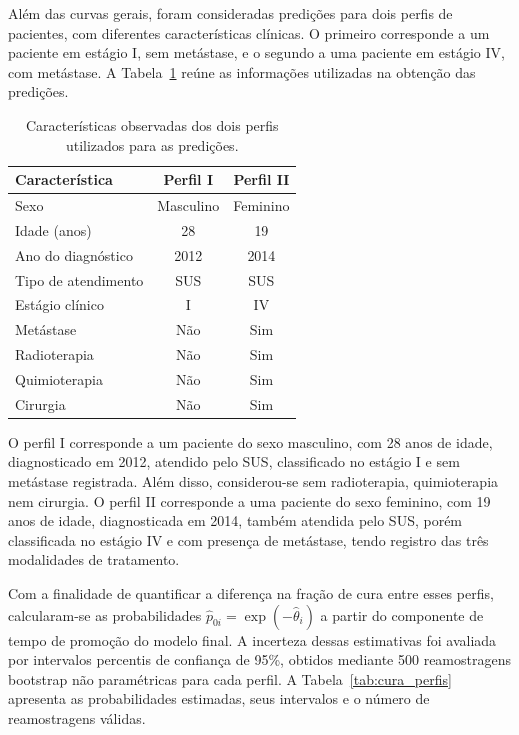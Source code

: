 \documentclass[11pt,a4paper]{article}
\begin{document}
Além das curvas gerais, foram consideradas predições para dois perfis de pacientes, com diferentes características clínicas. O primeiro corresponde a um paciente em estágio I, sem metástase, e o segundo a uma paciente em estágio IV, com metástase.  A Tabela~\ref{tab:caracteristicas_perfis} reúne as informações utilizadas na obtenção das predições.



\begin{table}[H]
\centering
\small
\setlength{\tabcolsep}{5pt}
\renewcommand{\arraystretch}{1.16}
\caption{Características observadas dos dois perfis utilizados para as predições.}
\label{tab:caracteristicas_perfis}
\begin{tabular}{@{}lcc@{}}
\toprule
Característica & Perfil I & Perfil II \\
\midrule
Sexo & Masculino & Feminino \\
Idade (anos) & 28 & 19 \\
Ano do diagnóstico & 2012 & 2014 \\
Tipo de atendimento & SUS & SUS \\
Estágio clínico & I & IV \\
Metástase & Não & Sim \\
Radioterapia & Não & Sim \\
Quimioterapia & Não & Sim \\
Cirurgia & Não & Sim \\
\bottomrule
\end{tabular}
\end{table}

O perfil I corresponde a um paciente do sexo masculino, com 28 anos de idade, diagnosticado em 2012, atendido pelo SUS, classificado no estágio I e sem metástase registrada. Além disso, considerou-se sem radioterapia, quimioterapia nem cirurgia. O perfil II corresponde a uma paciente do sexo feminino, com 19 anos de idade, diagnosticada em 2014, também atendida pelo SUS, porém classificada no estágio IV e com presença de metástase, tendo registro das três modalidades de tratamento. 

Com a finalidade de quantificar a diferença na fração de cura entre esses perfis, calcularam-se as probabilidades $\widehat p_{0i}=\exp(-\widehat\theta_i)$ a partir do componente de tempo de promoção do modelo final. A incerteza dessas estimativas foi avaliada por intervalos percentis de confiança de 95\%, obtidos mediante 500 reamostragens bootstrap não paramétricas para cada perfil. A Tabela~\ref{tab:cura_perfis} apresenta as probabilidades estimadas, seus intervalos e o número de reamostragens válidas.
\end{document}
